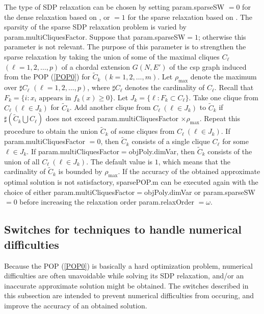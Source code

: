 The type of SDP relaxation can be chosen by setting
{\sf  param.sparseSW} $=0$ for the dense relaxation
based on  \cite{LAS01}, or $=1$ for the sparse relaxation based on \cite{WAKI04}.
The sparsity of
the sparse SDP relaxation problem is varied by {\sf param.multiCliquesFactor}.
Suppose that {\sf param.sparseSW}$= 1$; otherwise this parameter is not relevant.
The purpose of this parameter is to strengthen the sparse relaxation
by taking the union of some of the maximal cliques $C_{\ell}$ $(\ell=1,2,\ldots,p)$
of a chordal extension $G(N,E')$ of the
csp graph induced from the POP (\ref{POP0}) for $\widetilde{C}_k$ $(k=1,2,\ldots,m)$.
Let $\rho_{\max}$ denote the maximum over  $\sharp C_{\ell}$ $(\ell=1,2,\ldots,p)$,
where $\sharp C_{\ell}$ denotes the cardinality of $C_{\ell}$.
Recall that  $F_k = \{ i : x_i \mbox{ appears in } f_k(x) \geq 0 \}$.
Let $J_k = \{ \ell : F_k \subset C_{\ell} \}$.
Take one clique from $C_{\ell} \ (\ell \in J_k)$ for $\widetilde{C}_k$.
Add another clique
 from $C_{\ell} \ (\ell \in J_k)$ to $\widetilde{C}_k$ if
 $\sharp \left(\widetilde{C}_k \bigcup C_{\ell}\right)$ does not exceed
 {\sf param.multiCliquesFactor} $\times \rho_{\max}$.
 Repeat this procedure to obtain the union $\widetilde{C}_k$ of some cliques from $C_{\ell}
\ (\ell \in J_k)$.
If {\sf param.multiCliquesFactor} $ = 0$, then $\widetilde{C}_k$ consists of a single clique
$C_{\ell}$ for some $\ell \in J_k$.
If {\sf param.multiCliquesFactor}$=${\sf objPoly.dimVar}, then $\widetilde{C}_k$ consists
of the union of all $C_{\ell} \ (\ell \in J_k)$. The
default value is $1$, which means that
the cardinality of $\widetilde{C}_k$  is bounded by $\rho_{\max}$. If the accuracy of the obtained
approximate optimal solution is not satisfactory,  sparsePOP.m can be executed again with
the choice of either {\sf param.multiCliquesFactor}$=${\sf objPoly.dimVar} or {\sf  param.sparseSW} $=0$
before increasing the relaxation order {\sf param.relaxOrder} $=\omega$.

\subsection{Switches for techniques to handle numerical difficulties}

Because the POP (\ref{POP0}) is basically a hard optimization problem,
numerical difficulties are often unavoidable while solving its SDP relaxation,
and/or an inaccurate approximate solution might be obtained.
The switches described in this subsection  are intended to prevent numerical
difficulties from occuring, and improve the accuracy of an obtained solution.

